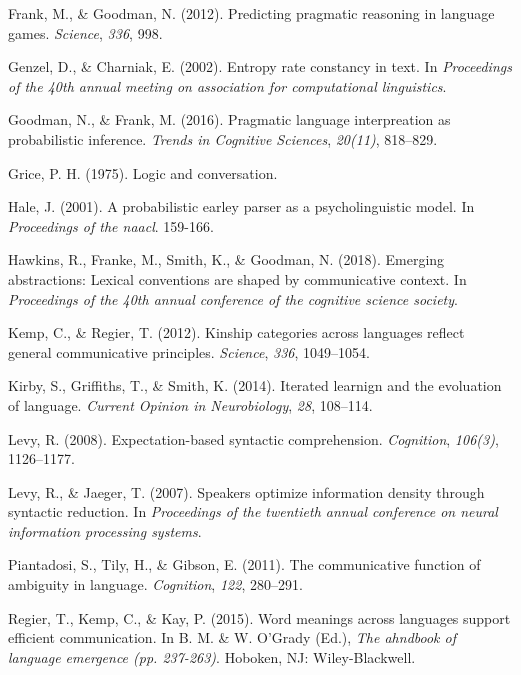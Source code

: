 \documentclass[10pt, letterpaper]{article}
\begin{document}
\hypertarget{ref-FrankGoodman2012a}{}
Frank, M., \& Goodman, N. (2012). Predicting pragmatic reasoning in
language games. \emph{Science}, \emph{336}, 998.

\hypertarget{ref-GenzelCharniak2002a}{}
Genzel, D., \& Charniak, E. (2002). Entropy rate constancy in text. In
\emph{Proceedings of the 40th annual meeting on association for
computational linguistics}.

\hypertarget{ref-GoodmanFrank2016a}{}
Goodman, N., \& Frank, M. (2016). Pragmatic language interpreation as
probabilistic inference. \emph{Trends in Cognitive Sciences},
\emph{20(11)}, 818--829.

\hypertarget{ref-Grice1975a}{}
Grice, P. H. (1975). Logic and conversation.

\hypertarget{ref-Hale2001a}{}
Hale, J. (2001). A probabilistic earley parser as a psycholinguistic
model. In \emph{Proceedings of the naacl}. 159-166.

\hypertarget{ref-HawkinsFrankeSmithGoodman2018a}{}
Hawkins, R., Franke, M., Smith, K., \& Goodman, N. (2018). Emerging
abstractions: Lexical conventions are shaped by communicative context.
In \emph{Proceedings of the 40th annual conference of the cognitive
science society}.

\hypertarget{ref-KempRegier2012a}{}
Kemp, C., \& Regier, T. (2012). Kinship categories across languages
reflect general communicative principles. \emph{Science}, \emph{336},
1049--1054.

\hypertarget{ref-KirbyGriffithsSmith2014a}{}
Kirby, S., Griffiths, T., \& Smith, K. (2014). Iterated learnign and the
evoluation of language. \emph{Current Opinion in Neurobiology},
\emph{28}, 108--114.

\hypertarget{ref-Levy2008a}{}
Levy, R. (2008). Expectation-based syntactic comprehension.
\emph{Cognition}, \emph{106(3)}, 1126--1177.

\hypertarget{ref-LevyJaeger2007a}{}
Levy, R., \& Jaeger, T. (2007). Speakers optimize information density
through syntactic reduction. In \emph{Proceedings of the twentieth
annual conference on neural information processing systems}.

\hypertarget{ref-Piantadosi2011a}{}
Piantadosi, S., Tily, H., \& Gibson, E. (2011). The communicative
function of ambiguity in language. \emph{Cognition}, \emph{122},
280--291.

\hypertarget{ref-RegierKempKay2015a}{}
Regier, T., Kemp, C., \& Kay, P. (2015). Word meanings across languages
support efficient communication. In B. M. \& W. O'Grady (Ed.), \emph{The
ahndbook of language emergence (pp. 237-263)}. Hoboken, NJ:
Wiley-Blackwell.
\end{document}
